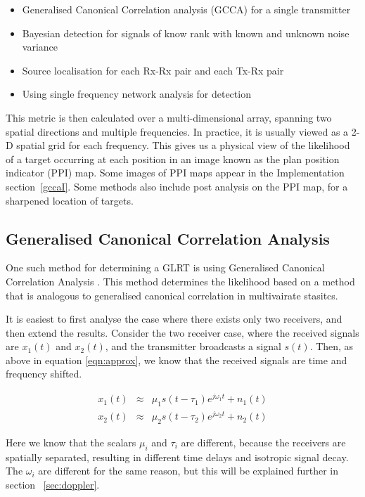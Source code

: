 \documentclass[12pt,openany,a4paper]{book}
\begin{document}
\begin{itemize}
\item{Generalised Canonical Correlation analysis (GCCA) for a single transmitter \cite{gcc}}
\item{Bayesian detection for signals of know rank with known and unknown noise variance \cite{SS15}}
\item{Source localisation for each Rx-Rx pair and each Tx-Rx pair \cite{DE16}}
\item{Using single frequency network analysis for detection \cite{SFN}}
\end{itemize}

\bigskip

This metric is then calculated over a multi-dimensional array, spanning two spatial directions and multiple frequencies. In practice, it is usually viewed as a 2-D spatial grid for each frequency. This gives us a physical view of the likelihood of a target occurring at each position in an image known as the plan position indicator (PPI) map. Some images of PPI maps appear in the Implementation section~\ref{gccaI}. Some methods also include post analysis on the PPI map, for a sharpened location of targets.

\subsection{Generalised Canonical Correlation Analysis}
One such method for determining a GLRT is using Generalised Canonical Correlation Analysis \cite{gcc}.
This method determines the likelihood based on a method that is analogous to generalised canonical correlation in multivairate stasitcs. 

\bigskip

It is easiest to first analyse the case where there exists only two receivers, and then extend the results. Consider the two receiver case, where the received signals are $x_{1}(t)$ and $x_{2}(t)$, and the transmitter broadcasts a signal $s(t)$. Then, as above in equation \ref{eqn:approx}, we know that the received signals are time and frequency shifted.

\begin{eqnarray}
x_1(t) & \approx & \mu_1 s(t-\tau_1) e^{j\omega_1 t} + n_1(t) \\
x_2(t) & \approx & \mu_2 s(t-\tau_2) e^{j\omega_2 t} + n_2(t)
\end{eqnarray}

\bigskip

Here we know that the scalars $\mu_i$ and $\tau_i$ are different, because the receivers are spatially separated, resulting in different time delays and isotropic signal decay. The $\omega_i$ are different for the same reason, but this will be explained further in section ~\ref{sec:doppler}.
\end{document}
